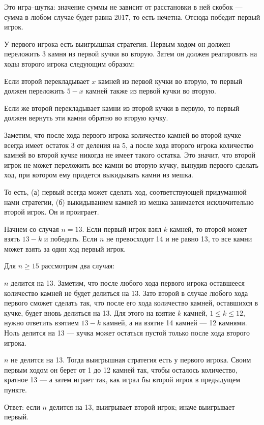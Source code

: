 ﻿
\begin{itemize}

\itA Это игра–шутка: значение суммы не зависит от расстановки в ней скобок — сумма в любом случае будет равна 2017, то есть нечетна. Отсюда победит первый игрок.

\itB У первого игрока есть выигрышная стратегия. Первым ходом он должен переложить 3 камня из первой кучки во вторую. Затем он должен реагировать на ходы второго игрока следующим образом:

\subitem Если второй перекладывает $x$ камней из первой кучки во вторую, то первый должен переложить $5-x$ камней также из первой кучки во вторую.

\subitem Если же второй перекладывает камни из второй кучки в первую, то первый должен вернуть эти камни обратно во вторую кучку.

Заметим, что после хода первого игрока количество камней во второй кучке всегда имеет остаток 3 от деления на 5, а после хода второго игрока количество камней во второй кучке никогда не имеет такого остатка. Это значит, что второй игрок не может переложить все камни во вторую кучку, вынудив первого сделать ход, при котором ему придется выкидывать камни из мешка.

То есть, (а) первый всегда может сделать ход, соответствующей придуманной нами стратегии, (б) выкидыванием камней из мешка занимается исключительно второй игрок. Он и проиграет.

\itC Начнем со случая $n=13$. Если первый игрок взял $k$ камней, то второй может взять $13-k$ и победить. Если $n$ не превосходит 14 и не равно 13, то все камни может взять за один ход первый игрок.

Для $n \ge 15$ рассмотрим два случая:

\subitem $n$ делится на 13. Заметим, что после любого хода первого игрока оставшееся количество камней не будет делиться на 13. Зато второй в случае любого хода первого сможет сделать так, что после его хода количество камней, оставшихся в кучке, будет вновь делиться на 13. Для этого на взятие $k$ камней, $1 \le k \le 12$, нужно ответить взятием $13-k$ камней, а на взятие 14 камней — 12 камнями. Ноль делится на 13 — кучка может остаться пустой только после хода второго игрока.

\subitem $n$ не делится на 13. Тогда выигрышная стратегия есть у первого игрока. Своим первым ходом он берет от 1 до 12 камней так, чтобы осталось количество, кратное 13 — а затем играет так, как играл бы второй игрок в предыдущем пункте.

Ответ: если $n$ делится на 13, выигрывает второй игрок; иначе выигрывает первый.
\end{itemize}
